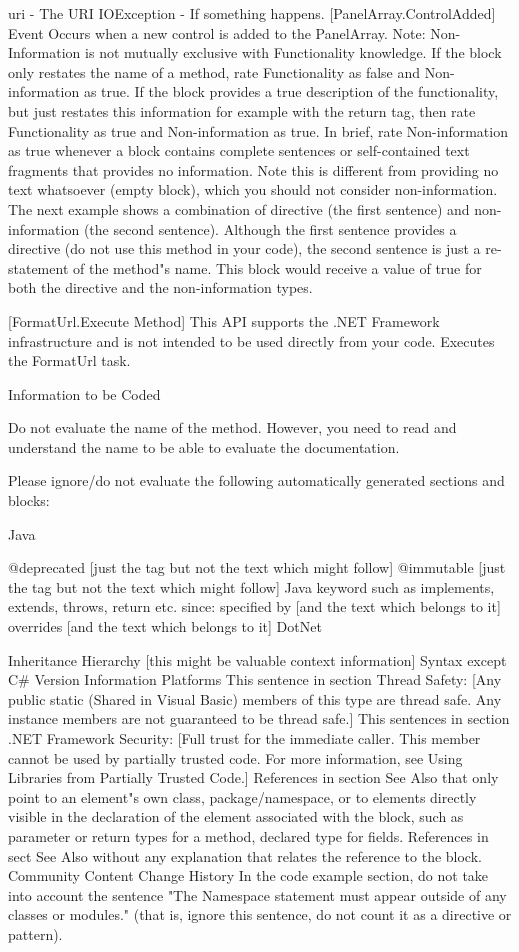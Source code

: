 uri - The URI
IOException - If something happens.
[PanelArray.ControlAdded] Event Occurs when a new control is added to the PanelArray.
Note: Non-Information is not mutually exclusive with Functionality knowledge. If the block only restates the name of a method, rate Functionality as false and Non-information as true. If the block provides a true description of the functionality, but just restates this information for example with the return tag, then rate Functionality as true and Non-information as true. In brief, rate Non-information as true whenever a block contains complete sentences or self-contained text fragments that provides no information.
Note
this is different from providing no text whatsoever (empty block), which you should not consider non-information.
The next example shows a combination of directive (the first sentence) and non-information (the second sentence). Although the first sentence provides a directive (do not use this method in your code), the second sentence is just a re-statement of the method"s name. This block would receive a value of true for both the directive and the non-information types.

[FormatUrl.Execute Method] This API supports the .NET Framework infrastructure and is not intended to be used directly from your code. Executes the FormatUrl task.
 

Information to be Coded

Do not evaluate the name of the method. However, you need to read and understand the name to be able to evaluate the documentation.

Please ignore/do not evaluate the following automatically generated sections and blocks:

Java

@deprecated [just the tag but not the text which might follow]
@immutable [just the tag but not the text which might follow]
Java keyword such as implements, extends, throws, return etc.
since:
specified by [and the text which belongs to it]
overrides [and the text which belongs to it]
DotNet

Inheritance Hierarchy [this might be valuable context information]
Syntax except C#
Version Information
Platforms
This sentence in section Thread Safety: [Any public static (Shared in Visual Basic) members of this type are thread safe. Any instance members are not guaranteed to be thread safe.]
This sentences in section .NET Framework Security: [Full trust for the immediate caller. This member cannot be used by partially trusted code. For more information, see Using Libraries from Partially Trusted Code.]
References in section See Also that only point to an element"s own class, package/namespace, or to elements directly visible in the declaration of the element associated with the block, such as parameter or return types for a method, declared type for fields.
References in sect See Also without any explanation that relates the reference to the block.
Community Content
Change History
In the code example section, do not take into account the sentence "The Namespace statement must appear outside of any classes or modules." (that is, ignore this sentence, do not count it as a directive or pattern).
 

